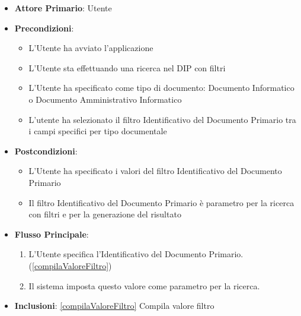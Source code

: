 \begin{itemize}
      \item \textbf{Attore Primario}: Utente
      \item \textbf{Precondizioni}:
      \begin{itemize}
            \item L'Utente ha avviato l'applicazione
            \item L'Utente sta effettuando una ricerca nel DIP con filtri
            \item L'Utente ha specificato come tipo di documento: Documento Informatico o Documento Amministrativo Informatico
            \item L'utente ha selezionato il filtro Identificativo del Documento Primario tra i campi specifici per tipo documentale
      \end{itemize}
      \item \textbf{Postcondizioni}: \begin{itemize}
            \item L'Utente ha specificato i valori del filtro Identificativo del Documento Primario
            \item Il filtro Identificativo del Documento Primario è parametro per la ricerca con filtri e per la generazione del risultato
      \end{itemize}
      \item \textbf{Flusso Principale}:
            \begin{enumerate}
                  \item L'Utente specifica l'Identificativo del Documento Primario. (\ref{compilaValoreFiltro})
                  \item Il sistema imposta questo valore come parametro per la ricerca.
            \end{enumerate}
      \item \textbf{Inclusioni}: \ref{compilaValoreFiltro} Compila valore filtro
\end{itemize}


